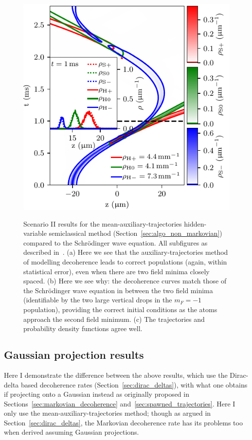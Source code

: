 {\begin{figure}
{    \includegraphics{figures/hidden_variables/hvsc_aux_mirror/trajectories.pdf}
    }
    \caption{Scenario II results for the mean-auxiliary-trajectories hidden-variable semiclassical method (Section~\ref{sec:algo_non_markovian}) compared to the Schr\"odinger wave equation. All subfigures as described in~. (a) Here we see that the auxiliary-trajectories method of modelling decoherence leads to correct populations (again, within statistical error), even when there are two field minima closely spaced. (b) Here we see why: the decoherence curves match those of the Schr\"odinger wave equation in between the two field minima (identifiable by the two large vertical drops in the $m_F=-1$ population), providing the correct initial conditions as the atoms approach the second field minimum. (c) The trajectories and probability density functions agree well.}\label{fig:scenario_two_aux}
\end{figure}
\restoregeometry}

\clearpage

\subsection{Gaussian projection results}

Here I demonstrate the difference between the above results, which use the Dirac-delta based decoherence rates (Section~\ref{sec:dirac_deltas}), with what one obtains if projecting onto a Gaussian instead as originally proposed in Sections~\ref{sec:markovian_decoherence} and~\ref{sec:spawned_trajectories}. Here I only use the mean-auxiliary-trajectories method; though as argued in Section~\ref{sec:dirac_deltas}, the Markovian decoherence rate has its problems too when derived assuming Gaussian projections.

